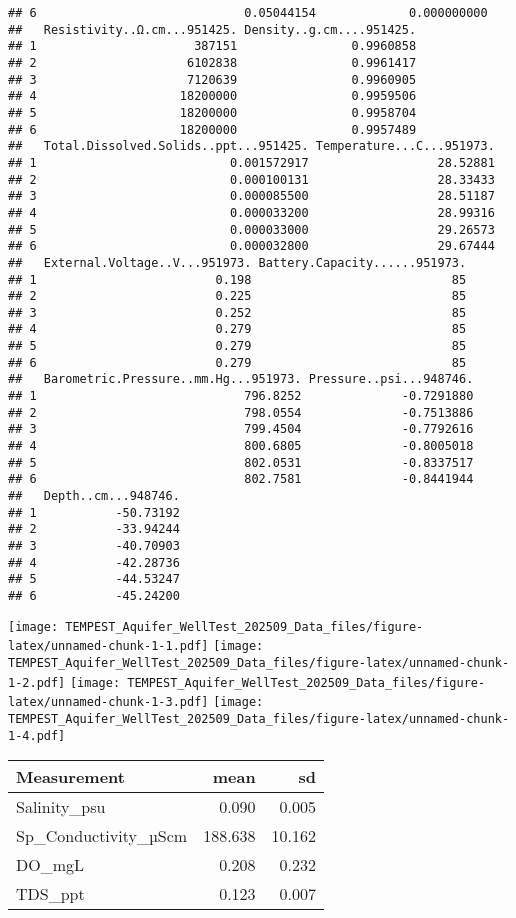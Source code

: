 \documentclass[
]{article}
\begin{document}
\begin{verbatim}
## 6                             0.05044154             0.000000000
##   Resistivity..Ω.cm...951425. Density..g.cm....951425.
## 1                      387151                0.9960858
## 2                     6102838                0.9961417
## 3                     7120639                0.9960905
## 4                    18200000                0.9959506
## 5                    18200000                0.9958704
## 6                    18200000                0.9957489
##   Total.Dissolved.Solids..ppt...951425. Temperature...C...951973.
## 1                           0.001572917                  28.52881
## 2                           0.000100131                  28.33433
## 3                           0.000085500                  28.51187
## 4                           0.000033200                  28.99316
## 5                           0.000033000                  29.26573
## 6                           0.000032800                  29.67444
##   External.Voltage..V...951973. Battery.Capacity......951973.
## 1                         0.198                            85
## 2                         0.225                            85
## 3                         0.252                            85
## 4                         0.279                            85
## 5                         0.279                            85
## 6                         0.279                            85
##   Barometric.Pressure..mm.Hg...951973. Pressure..psi...948746.
## 1                             796.8252              -0.7291880
## 2                             798.0554              -0.7513886
## 3                             799.4504              -0.7792616
## 4                             800.6805              -0.8005018
## 5                             802.0531              -0.8337517
## 6                             802.7581              -0.8441944
##   Depth..cm...948746.
## 1           -50.73192
## 2           -33.94244
## 3           -40.70903
## 4           -42.28736
## 5           -44.53247
## 6           -45.24200
\end{verbatim}

\texttt{[image: TEMPEST\_Aquifer\_WellTest\_202509\_Data\_files/figure-latex/unnamed-chunk-1-1.pdf]}
\texttt{[image: TEMPEST\_Aquifer\_WellTest\_202509\_Data\_files/figure-latex/unnamed-chunk-1-2.pdf]}
\texttt{[image: TEMPEST\_Aquifer\_WellTest\_202509\_Data\_files/figure-latex/unnamed-chunk-1-3.pdf]}
\texttt{[image: TEMPEST\_Aquifer\_WellTest\_202509\_Data\_files/figure-latex/unnamed-chunk-1-4.pdf]}

\begin{longtable}[]{@{}lrr@{}}
\toprule\noalign{}
Measurement & mean & sd \\
\midrule\noalign{}
\endhead
\bottomrule\noalign{}
\endlastfoot
Salinity\_psu & 0.090 & 0.005 \\
Sp\_Conductivity\_µScm & 188.638 & 10.162 \\
DO\_mgL & 0.208 & 0.232 \\
TDS\_ppt & 0.123 & 0.007 \\
\end{longtable}
\end{document}
